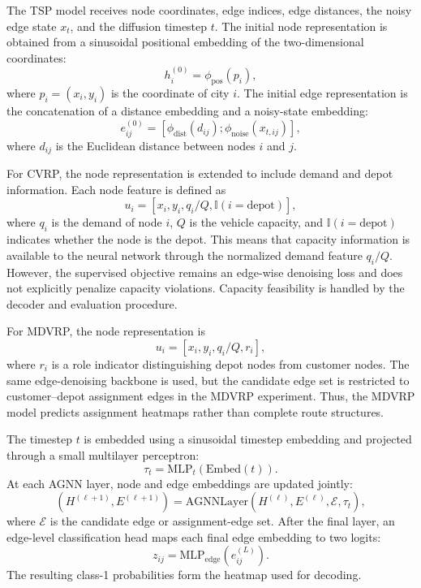 The TSP model receives node coordinates, edge indices, edge distances, the noisy edge state \(x_t\), and the diffusion timestep \(t\). The initial node representation is obtained from a sinusoidal positional embedding of the two-dimensional coordinates:
\[
    h_i^{(0)} = \phi_{\mathrm{pos}}(p_i),
\]
where \(p_i=(x_i,y_i)\) is the coordinate of city \(i\). The initial edge representation is the concatenation of a distance embedding and a noisy-state embedding:
\[
    e_{ij}^{(0)}
    =
    \left[
        \phi_{\mathrm{dist}}(d_{ij});
        \phi_{\mathrm{noise}}(x_{t,ij})
    \right],
\]
where \(d_{ij}\) is the Euclidean distance between nodes \(i\) and \(j\).

For CVRP, the node representation is extended to include demand and depot information. Each node feature is defined as
\[
    u_i =
    [x_i, y_i, q_i/Q, \mathbb{I}(i=\mathrm{depot})],
\]
where \(q_i\) is the demand of node \(i\), \(Q\) is the vehicle capacity, and \(\mathbb{I}(i=\mathrm{depot})\) indicates whether the node is the depot. This means that capacity information is available to the neural network through the normalized demand feature \(q_i/Q\). However, the supervised objective remains an edge-wise denoising loss and does not explicitly penalize capacity violations. Capacity feasibility is handled by the decoder and evaluation procedure.

For MDVRP, the node representation is
\[
    u_i =
    [x_i, y_i, q_i/Q, r_i],
\]
where \(r_i\) is a role indicator distinguishing depot nodes from customer nodes. The same edge-denoising backbone is used, but the candidate edge set is restricted to customer--depot assignment edges in the MDVRP experiment. Thus, the MDVRP model predicts assignment heatmaps rather than complete route structures.

The timestep \(t\) is embedded using a sinusoidal timestep embedding and projected through a small multilayer perceptron:
\[
    \tau_t = \mathrm{MLP}_{t}(\mathrm{Embed}(t)).
\]
At each AGNN layer, node and edge embeddings are updated jointly:
\[
    (H^{(\ell+1)}, E^{(\ell+1)})
    =
    \mathrm{AGNNLayer}
    \left(
        H^{(\ell)}, E^{(\ell)}, \mathcal{E}, \tau_t
    \right),
\]
where \(\mathcal{E}\) is the candidate edge or assignment-edge set. After the final layer, an edge-level classification head maps each final edge embedding to two logits:
\[
    z_{ij}
    =
    \mathrm{MLP}_{\mathrm{edge}}
    \left(
        e_{ij}^{(L)}
    \right).
\]
The resulting class-1 probabilities form the heatmap used for decoding.

